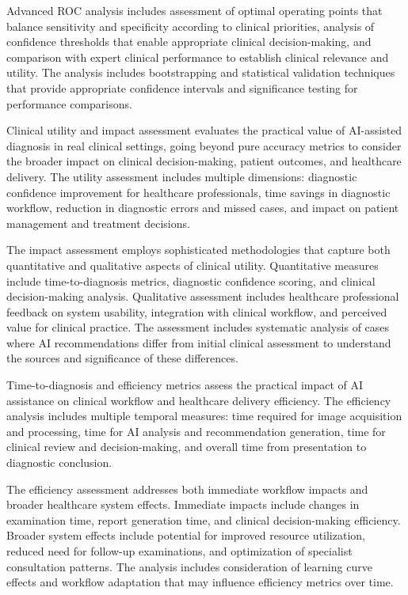 Advanced ROC analysis includes assessment of optimal operating points that balance sensitivity and specificity according to clinical priorities, analysis of confidence thresholds that enable appropriate clinical decision-making, and comparison with expert clinical performance to establish clinical relevance and utility. The analysis includes bootstrapping and statistical validation techniques that provide appropriate confidence intervals and significance testing for performance comparisons.

Clinical utility and impact assessment evaluates the practical value of AI-assisted diagnosis in real clinical settings, going beyond pure accuracy metrics to consider the broader impact on clinical decision-making, patient outcomes, and healthcare delivery. The utility assessment includes multiple dimensions: diagnostic confidence improvement for healthcare professionals, time savings in diagnostic workflow, reduction in diagnostic errors and missed cases, and impact on patient management and treatment decisions.

The impact assessment employs sophisticated methodologies that capture both quantitative and qualitative aspects of clinical utility. Quantitative measures include time-to-diagnosis metrics, diagnostic confidence scoring, and clinical decision-making analysis. Qualitative assessment includes healthcare professional feedback on system usability, integration with clinical workflow, and perceived value for clinical practice. The assessment includes systematic analysis of cases where AI recommendations differ from initial clinical assessment to understand the sources and significance of these differences.

Time-to-diagnosis and efficiency metrics assess the practical impact of AI assistance on clinical workflow and healthcare delivery efficiency. The efficiency analysis includes multiple temporal measures: time required for image acquisition and processing, time for AI analysis and recommendation generation, time for clinical review and decision-making, and overall time from presentation to diagnostic conclusion.

The efficiency assessment addresses both immediate workflow impacts and broader healthcare system effects. Immediate impacts include changes in examination time, report generation time, and clinical decision-making efficiency. Broader system effects include potential for improved resource utilization, reduced need for follow-up examinations, and optimization of specialist consultation patterns. The analysis includes consideration of learning curve effects and workflow adaptation that may influence efficiency metrics over time.

